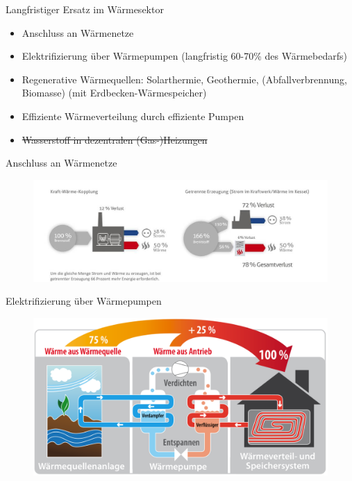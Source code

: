 \documentclass[10pt]{beamer}
\begin{document}
\begin{frame}{Langfristiger Ersatz im Wärmesektor}
 \begin{itemize} 
    \item Anschluss an Wärmenetze
    \item Elektrifizierung über Wärmepumpen (langfristig 60-70\% des Wärmebedarfs)
    \item Regenerative Wärmequellen: Solarthermie, Geothermie, (Abfallverbrennung, Biomasse)
      (mit Erdbecken-Wärmespeicher) 
    \item Effiziente Wärmeverteilung durch effiziente Pumpen 
    \item \sout{Wasserstoff in dezentralen (Gas-)Heizungen}
 \end{itemize}
\end{frame}

\begin{frame}{Anschluss an Wärmenetze}
\begin{figure}
\includegraphics[width=\textwidth]{fig/kraft-waerme-kopplung.jpg}

\scriptsize{}
\end{figure}
\end{frame}


\begin{frame}{Elektrifizierung über Wärmepumpen}
\begin{figure}
\includegraphics[width=\textwidth]{fig/waermepumpe.png}

\scriptsize{}
\end{figure}
\end{frame}
\end{document}
